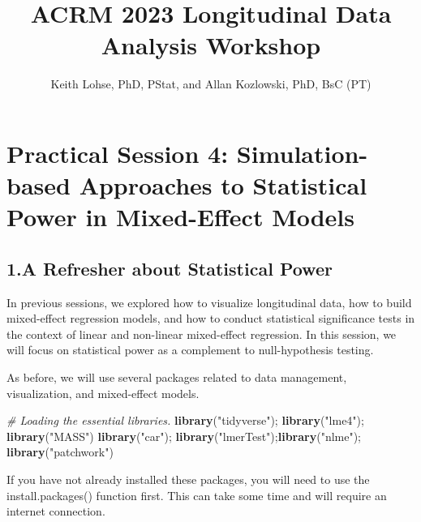 \documentclass[
]{article}
\title{ACRM 2023 Longitudinal Data Analysis Workshop}
\author{Keith Lohse, PhD, PStat, and Allan Kozlowski, PhD, BsC (PT)}
\date{}
\newenvironment{Shaded}{\begin{snugshade}}{\end{snugshade}}
\newcommand{\CommentTok}[1]{\textcolor[rgb]{0.56,0.35,0.01}{\textit{#1}}}
\newcommand{\FunctionTok}[1]{\textcolor[rgb]{0.13,0.29,0.53}{\textbf{#1}}}
\newcommand{\NormalTok}[1]{#1}
\newcommand{\StringTok}[1]{\textcolor[rgb]{0.31,0.60,0.02}{#1}}
\begin{document}
\maketitle

\hypertarget{practical-session-4-simulation-based-approaches-to-statistical-power-in-mixed-effect-models}{%
\section{Practical Session 4: Simulation-based Approaches to Statistical
Power in Mixed-Effect
Models}\label{practical-session-4-simulation-based-approaches-to-statistical-power-in-mixed-effect-models}}

\hypertarget{a-refresher-about-statistical-power}{%
\subsection{1.A Refresher about Statistical
Power}\label{a-refresher-about-statistical-power}}

In previous sessions, we explored how to visualize longitudinal data,
how to build mixed-effect regression models, and how to conduct
statistical significance tests in the context of linear and non-linear
mixed-effect regression. In this session, we will focus on statistical
power as a complement to null-hypothesis testing.

As before, we will use several packages related to data management,
visualization, and mixed-effect models.

\begin{Shaded}
\begin{Highlighting}[]
\CommentTok{\# Loading the essential libraries. }
\FunctionTok{library}\NormalTok{(}\StringTok{"tidyverse"}\NormalTok{); }\FunctionTok{library}\NormalTok{(}\StringTok{"lme4"}\NormalTok{); }\FunctionTok{library}\NormalTok{(}\StringTok{"MASS"}\NormalTok{)}
\FunctionTok{library}\NormalTok{(}\StringTok{"car"}\NormalTok{); }\FunctionTok{library}\NormalTok{(}\StringTok{"lmerTest"}\NormalTok{);}\FunctionTok{library}\NormalTok{(}\StringTok{"nlme"}\NormalTok{); }\FunctionTok{library}\NormalTok{(}\StringTok{"patchwork"}\NormalTok{)}
\end{Highlighting}
\end{Shaded}

If you have not already installed these packages, you will need to use
the install.packages() function first. This can take some time and will
require an internet connection.
\end{document}
